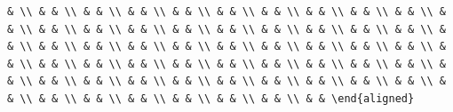 \documentclass[
  ukrainian,
]{article}
\begin{document}
\begin{verbatim}
& \\ & & \\ & & \\ & & \\ & & \\ & & \\ & & \\ & & \\ & & \\ & & \\ & & \\ & & \\ & & \\ & & \\ & & \\ & & \\ & & \\ & & \\ & & \\ & & \\ & & \\ & & \\ & & \\ & & \\ & & \\ & & \\ & & \\ & & \\ & & \\ & & \\ & & \\ & & \\ & & \\ & & \\ & & \\ & & \\ & & \\ & & \\ & & \\ & & \\ & & \\ & & \\ & & \\ & & \\ & & \\ & & \\ & & \\ & & \\ & & \\ & & \\ & & \\ & & \\ & & \\ & & \\ & & \\ & & \\ & & \\ & & \end{aligned}
\end{verbatim}
\end{document}

